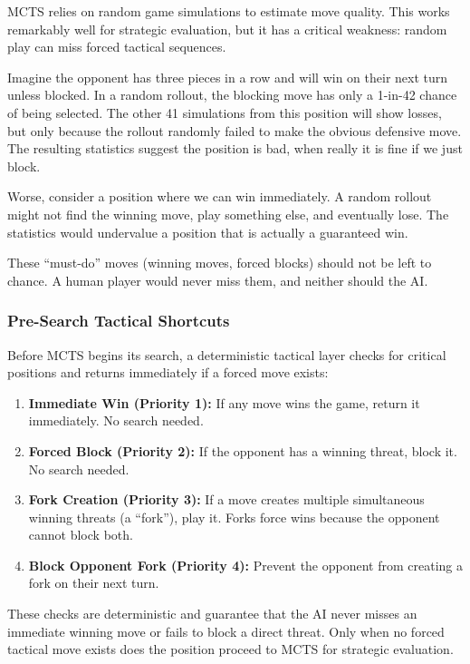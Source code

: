 \documentclass[11pt]{article}
\begin{document}
MCTS relies on random game simulations to estimate move quality. This works remarkably well for strategic evaluation, but it has a critical weakness: random play can miss forced tactical sequences.

Imagine the opponent has three pieces in a row and will win on their next turn unless blocked. In a random rollout, the blocking move has only a 1-in-42 chance of being selected. The other 41 simulations from this position will show losses, but only because the rollout randomly failed to make the obvious defensive move. The resulting statistics suggest the position is bad, when really it is fine if we just block.

Worse, consider a position where we can win immediately. A random rollout might not find the winning move, play something else, and eventually lose. The statistics would undervalue a position that is actually a guaranteed win.

These ``must-do'' moves (winning moves, forced blocks) should not be left to chance. A human player would never miss them, and neither should the AI.

\subsubsection{Pre-Search Tactical Shortcuts}

Before MCTS begins its search, a deterministic tactical layer checks for critical positions and returns immediately if a forced move exists:

\begin{enumerate}
    \item \textbf{Immediate Win (Priority 1):} If any move wins the game, return it immediately. No search needed.
    \item \textbf{Forced Block (Priority 2):} If the opponent has a winning threat, block it. No search needed.
    \item \textbf{Fork Creation (Priority 3):} If a move creates multiple simultaneous winning threats (a ``fork''), play it. Forks force wins because the opponent cannot block both.
    \item \textbf{Block Opponent Fork (Priority 4):} Prevent the opponent from creating a fork on their next turn.
\end{enumerate}

These checks are deterministic and guarantee that the AI never misses an immediate winning move or fails to block a direct threat. Only when no forced tactical move exists does the position proceed to MCTS for strategic evaluation.
\end{document}
